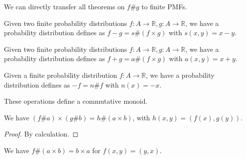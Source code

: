 We can directly transfer all theorems on $f \# g$ to finite PMFs.

\begin{definition}
    \label{instSubFinPMF}
    \leanok
    Given two finite probability distributions $f: A \to \mathbb{R}, g : A \to \mathbb{R}$, we have a probability distribution
    defines as $f-g = s \# (f \times g)$ with $s(x, y) = x-y$.
\end{definition}

\begin{definition}
    \label{instAddFinPMF}
    \leanok
    Given two finite probability distributions $f: A \to \mathbb{R}, g : A \to \mathbb{R}$, we have a probability distribution
    defines as $f+g = a \# (f \times g)$ with $a(x, y) = x+y$.
\end{definition}

\begin{definition}
    \label{instNegFinPMF}
    \leanok
    Given a finite probability distribution $f: A \to \mathbb{R}$, we have a probability distribution
    defines as $-f = n \# f$ with $n(x) = -x$.
\end{definition}

\begin{proposition}
    \label{FinPMFCommMonoid}
    \leanok
    These operations define a commutative monoid.
\end{proposition}


\begin{lemma}
    \label{FinPMF.apply_mul}
    \leanok
    We have $(f \# a) \times (g \# b) = h \# (a \times b)$, with $h(x, y) = (f(x), g(y))$.
\end{lemma}

\begin{proof}
    \leanok
    By calculation.
\end{proof}

\begin{lemma}
    \label{FinPMF.apply_swap}
    \leanok
    We have $f \# (a \times b) = b \times a$ for $f(x, y) = (y, x)$.
\end{lemma}

